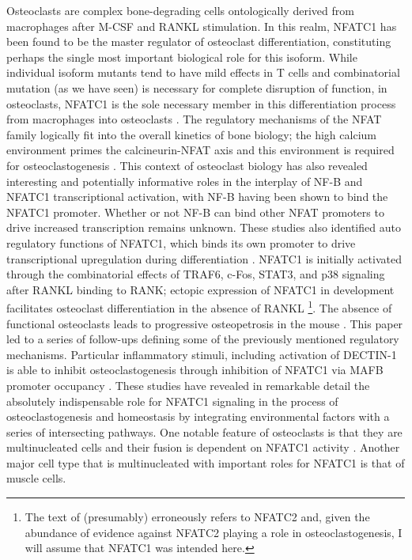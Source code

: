 Osteoclasts are complex bone-degrading cells ontologically derived from macrophages after M-CSF and RANKL stimulation. In this realm, NFATC1 has been found to be the master regulator of osteoclast differentiation, constituting perhaps the single most important biological role for this isoform. While individual isoform mutants tend to have mild effects in T cells and combinatorial mutation (as we have seen) is necessary for complete disruption of function, in osteoclasts, NFATC1 is the sole necessary member in this differentiation process from macrophages into osteoclasts \citep{KimKim2014}. The regulatory mechanisms of the NFAT family logically fit into the overall kinetics of bone biology; the high calcium environment primes the calcineurin-NFAT axis and this environment is required for osteoclastogenesis \citep{NegishiKoga2009}. This context of osteoclast biology has also revealed interesting and potentially informative roles in the interplay of NF-\textkappa B and NFATC1 transcriptional activation, with NF-\textkappa B having been shown to bind the NFATC1 promoter. Whether or not NF-\textkappa B can bind other NFAT promoters to drive increased transcription remains unknown. These studies also identified auto regulatory functions of NFATC1, which binds its own promoter to drive transcriptional upregulation during differentiation \citep{Asagiri2005}. NFATC1 is initially activated through the combinatorial effects of TRAF6, c-Fos, STAT3, and p38 signaling after RANKL binding to RANK; ectopic expression of NFATC1 in development facilitates osteoclast differentiation in the absence of RANKL \citep{Takayanagi2002, Huang2006; Yang2019, Matsumoto2004, Huang2020}\footnote{The text of \citep{Huang2020} (presumably) erroneously refers to NFATC2 and, given the abundance of evidence against NFATC2 playing a role in osteoclastogenesis, I will assume that NFATC1 was intended here.}. The absence of functional osteoclasts leads to progressive osteopetrosis in the mouse \citep{Takayanagi2002, KimKim2014}. This paper led to a series of follow-ups defining some of the previously mentioned regulatory mechanisms. Particular inflammatory stimuli, including activation of DECTIN-1 is able to inhibit osteoclastogenesis through inhibition of NFATC1 via MAFB promoter occupancy \citep{Zhu2017}. These studies have revealed in remarkable detail the absolutely indispensable role for NFATC1 signaling in the process of osteoclastogenesis and homeostasis by integrating environmental factors with a series of intersecting pathways. One notable feature of osteoclasts is that they are multinucleated cells and their fusion is dependent on NFATC1 activity \citep{Kim2008}. Another major cell type that is multinucleated with important roles for NFATC1 is that of muscle cells. 

